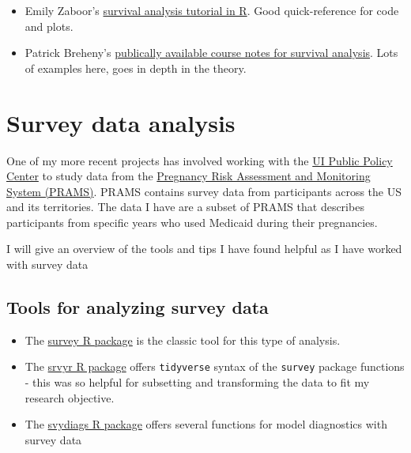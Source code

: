 \documentclass[
]{book}
\begin{document}
\begin{itemize}
\item
  Emily Zaboor's \href{https://www.emilyzabor.com/tutorials/survival_analysis_in_r_tutorial.html}{survival analysis tutorial in R}. Good quick-reference for code and plots.
\item
  Patrick Breheny's \href{https://myweb.uiowa.edu/pbreheny/7210/f19/index.html}{publically available course notes for survival analysis}. Lots of examples here, goes in depth in the theory.
\end{itemize}

\hypertarget{survey-data-analysis}{%
\chapter{Survey data analysis}\label{survey-data-analysis}}

One of my more recent projects has involved working with the \href{https://ppc.uiowa.edu/}{UI Public Policy Center} to study data from the \href{https://www.cdc.gov/prams/index.htm}{Pregnancy Risk Assessment and Monitoring System (PRAMS)}. PRAMS contains survey data from participants across the US and its territories. The data I have are a subset of PRAMS that describes participants from specific years who used Medicaid during their pregnancies.

I will give an overview of the tools and tips I have found helpful as I have worked with survey data

\hypertarget{tools-for-analyzing-survey-data}{%
\section{Tools for analyzing survey data}\label{tools-for-analyzing-survey-data}}

\begin{itemize}
\item
  The \href{https://cran.r-project.org/web/packages/survey/index.html}{survey R package} is the classic tool for this type of analysis.
\item
  The \href{https://cran.r-project.org/web/packages/srvyr/vignettes/srvyr-vs-survey.html}{srvyr R package} offers \texttt{tidyverse} syntax of the \texttt{survey} package functions - this was so helpful for subsetting and transforming the data to fit my research objective.
\item
  The \href{https://cran.r-project.org/web/packages/svydiags/index.html}{svydiags R package} offers several functions for model diagnostics with survey data
\end{itemize}
\end{document}

